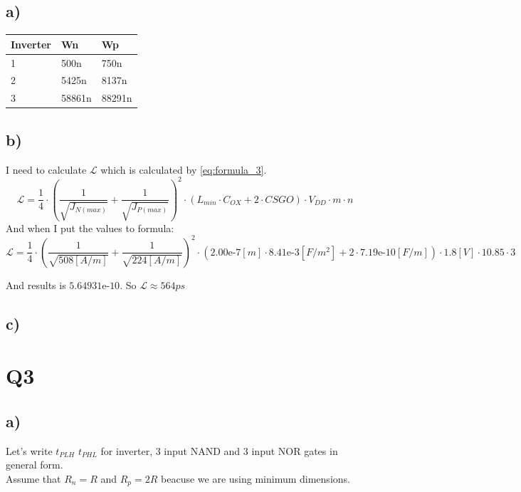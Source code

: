 \documentclass[a4paper,10pt]{article}
\begin{document}
\subsection*{a)}
\begin{center}
\begin{tabular}{|l|l|l|}\hline
Inverter & Wn & Wp\\\hline
1 & 500n & 750n\\\hline
2 & 5425n & 8137n\\\hline
3 & 58861n & 88291n\\\hline
\end{tabular}
\end{center}

\subsection*{b)}
I need to calculate $\mathcal{L}$ which is calculated by \autoref{eq:formula_3}.
\begin{equation}\label{eq:formula_3}
\mathcal{L} = \frac{1}{4}\cdot \left(\frac{1}{\sqrt{J_{N(max)}}} + \frac{1}{\sqrt{J_{P(max)}}}  \right)^2 \cdot (L_{min}\cdot C_{OX} +2\cdot CSGO)\cdot V_{DD}\cdot m \cdot n
\end{equation}
And when I put the values to formula:
\[
\mathcal{L} = \frac{1}{4}\cdot \left(\frac{1}{\sqrt{508[A/m]}} + \frac{1}{\sqrt{224[A/m]}}  \right)^2 \cdot (2.00\text{e-}7[m]\cdot 8.41\text{e-}3[F/m^2] +2\cdot 7.19\text{e-}10[F/m])\cdot 1.8[V]\cdot 10.85 \cdot 3
\]

And results is $5.64931\text{e-}10$. So $\mathcal{L}\approx 564 ps$\\

\subsection*{c)}

\newpage
\section*{Q3}
\subsection*{a)}
Let's write $t_{PLH}$ $t_{PHL}$ for inverter, 3 input NAND and 3 input NOR gates in general form.\\

Assume that $R_n=R$ and $R_p=2R$ beacuse we are using minimum dimensions.\\
\end{document}
